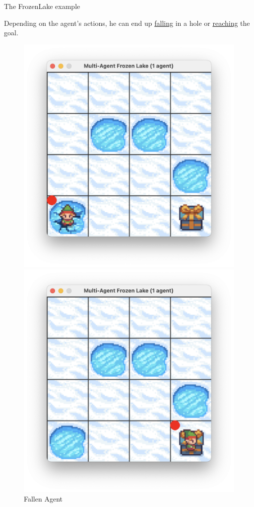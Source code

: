 \documentclass[aspectratio=169,xcolor=dvipsnames]{beamer}
\begin{document}
\begin{frame}{The FrozenLake example}

Depending on the agent's actions, he can end up \underline{falling} in a hole or \underline{reaching} the goal.
    
\begin{figure}[h!]
    \centering
    \begin{minipage}{0.45\textwidth} 
        \centering
        \includegraphics[scale=0.3]{images/fallen-agent.png}
        \caption{Fallen Agent}
    \end{minipage}%
    \begin{minipage}{0.45\textwidth} 
        \centering
        \includegraphics[scale=0.3]{images/goal-agent.png}

\end{minipage}
\end{figure}
\end{frame}
\end{document}
